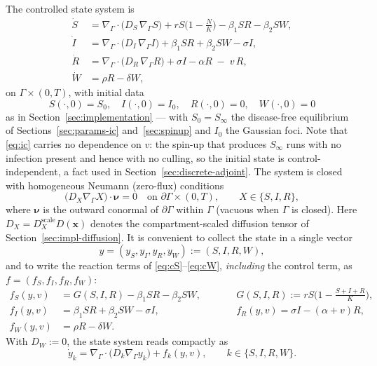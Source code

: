 \documentclass[11pt]{article}
\newcommand{\Grad}{\nabla_\Gamma}
\newcommand{\Div}{\nabla_\Gamma\cdot}
\begin{document}
The controlled state system is
\begin{align}
\dot S &= \Div\big(D_S\,\Grad S\big) + rS\Big(1-\frac{N}{K}\Big) - \beta_1 S R - \beta_2 S W, \label{eq:cS} \\
\dot I &= \Div\big(D_I\,\Grad I\big) + \beta_1 S R + \beta_2 S W - \sigma I, \label{eq:cI} \\
\dot R &= \Div\big(D_R\,\Grad R\big) + \sigma I - \alpha R \;-\; v\,R, \label{eq:cR} \\
\dot W &= \rho R - \delta W, \label{eq:cW}
\end{align}
on $\Gamma\times(0,T)$, with initial data
\begin{equation}
S(\cdot,0)=S_0,\quad I(\cdot,0)=I_0,\quad R(\cdot,0)=0,\quad W(\cdot,0)=0
\label{eq:ic}
\end{equation}
as in Section~\ref{sec:implementation} --- with $S_0 = S_\infty$ the disease-free equilibrium of Sections~\ref{sec:params-ic} and~\ref{sec:spinup} and $I_0$ the Gaussian foci. Note that \eqref{eq:ic} carries no dependence on $v$: the spin-up that produces $S_\infty$ runs with no infection present and hence with no culling, so the initial state is control-independent, a fact used in Section~\ref{sec:discrete-adjoint}. The system is closed with homogeneous Neumann (zero-flux) conditions
\begin{equation}
\big(D_X\Grad X\big)\cdot\boldsymbol\nu = 0 \quad\text{on }\partial\Gamma\times(0,T), \qquad X\in\{S,I,R\},
\label{eq:cbc}
\end{equation}
where $\boldsymbol\nu$ is the outward conormal of $\partial\Gamma$ within $\Gamma$ (vacuous when $\Gamma$ is closed). Here $D_X = D_X^{\text{scale}}D(\mathbf{x})$ denotes the compartment-scaled diffusion tensor of Section~\ref{sec:impl-diffusion}. It is convenient to collect the state in a single vector
\[
y = (y_S,y_I,y_R,y_W) := (S,I,R,W),
\]
and to write the reaction terms of \eqref{eq:cS}--\eqref{eq:cW}, \emph{including} the control term, as $f = (f_S,f_I,f_R,f_W)$:
\begin{equation}
\begin{aligned}
f_S(y,v) &= G(S,I,R) - \beta_1 SR - \beta_2 SW, \qquad
&&G(S,I,R) := rS\Big(1-\frac{S+I+R}{K}\Big),\\
f_I(y,v) &= \beta_1 SR + \beta_2 SW - \sigma I, \qquad
&&f_R(y,v) = \sigma I - (\alpha+v) R,\\
f_W(y,v) &= \rho R - \delta W. &&
\end{aligned}
\label{eq:fdef}
\end{equation}
With $D_W := 0$, the state system reads compactly as
\begin{equation}
\dot y_k = \Div\big(D_k\Grad y_k\big) + f_k(y,v), \qquad k\in\{S,I,R,W\}.
\label{eq:state-compact}
\end{equation}
\end{document}
